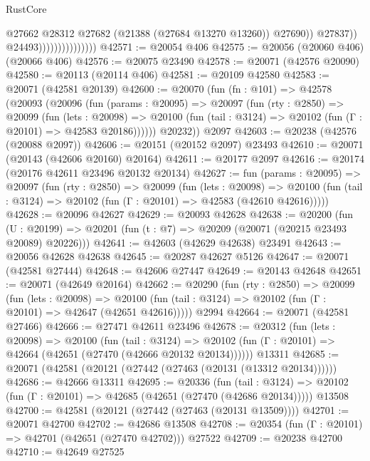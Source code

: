 \begin{lexlean}{RustCore}
\begin{coremodule}
                                          @27662
                                          @28312
                                          @27682
                                          (@21388 (@27684 @13270 @13260))
                                          @27690))
                                      @27837))
                                  @24493)))))))))))))))
@42571 := @20054 @406
@42575 := @20056 (@20060 @406) (@20066 @406)
@42576 := @20075 @23490
@42578 := @20071 (@42576 @20090)
@42580 := @20113 (@20114 @406)
@42581 := @20109 @42580
@42583 := @20071 (@42581 @20139)
@42600 := @20070
    (fun (fn : @101) =>
    @42578
      (@20093
        (@20096
          (fun (params : @20095) =>
          @20097
            (fun (rty : @2850) =>
            @20099
              (fun (lets : @20098) =>
              @20100 (fun (tail : @3124) => @20102 (fun (Γ : @20101) => @42583 @20186))))))
        @20232))
    @2097
@42603 := @20238 (@42576 (@20088 @2097))
@42606 := @20151 (@20152 @2097) @23493
@42610 := @20071 (@20143 (@42606 @20160) @20164)
@42611 := @20177 @2097
@42616 := @20174 (@20176 @42611 @23496 @20132 @20134)
@42627 := fun (params : @20095) =>
  @20097
    (fun (rty : @2850) =>
    @20099
      (fun (lets : @20098) =>
      @20100 (fun (tail : @3124) => @20102 (fun (Γ : @20101) => @42583 (@42610 @42616)))))
@42628 := @20096 @42627
@42629 := @20093 @42628
@42638 := @20200
    (fun (U : @20199) => @20201 (fun (t : @7) => @20209 (@20071 (@20215 @23493 @20089) @20226)))
@42641 := @42603 (@42629 @42638) @23491
@42643 := @20056 @42628 @42638
@42645 := @20287 @42627 @5126
@42647 := @20071 (@42581 @27444)
@42648 := @42606 @27447
@42649 := @20143 @42648
@42651 := @20071 (@42649 @20164)
@42662 := @20290
    (fun (rty : @2850) =>
    @20099
      (fun (lets : @20098) =>
      @20100 (fun (tail : @3124) => @20102 (fun (Γ : @20101) => @42647 (@42651 @42616)))))
    @2994
@42664 := @20071 (@42581 @27466)
@42666 := @27471 @42611 @23496
@42678 := @20312
    (fun (lets : @20098) =>
    @20100
      (fun (tail : @3124) =>
      @20102 (fun (Γ : @20101) => @42664 (@42651 (@27470 (@42666 @20132 @20134))))))
    @13311
@42685 := @20071 (@42581 (@20121 (@27442 (@27463 (@20131 (@13312 @20134))))))
@42686 := @42666 @13311
@42695 := @20336
    (fun (tail : @3124) => @20102 (fun (Γ : @20101) => @42685 (@42651 (@27470 (@42686 @20134)))))
    @13508
@42700 := @42581 (@20121 (@27442 (@27463 (@20131 @13509))))
@42701 := @20071 @42700
@42702 := @42686 @13508
@42708 := @20354 (fun (Γ : @20101) => @42701 (@42651 (@27470 @42702))) @27522
@42709 := @20238 @42700
@42710 := @42649 @27525

\end{coremodule}
\end{lexlean}

